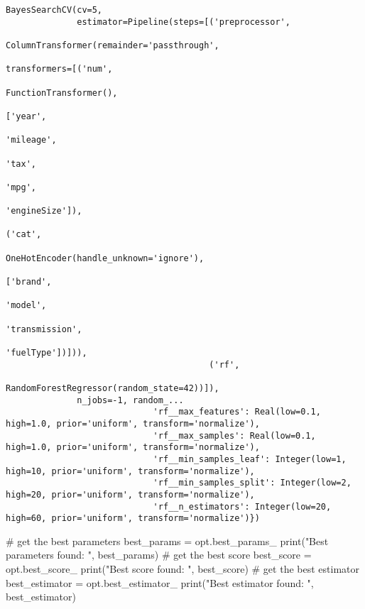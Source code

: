 \documentclass[
  letterpaper,
  DIV=11,
  numbers=noendperiod]{scrreprt}
\newenvironment{Shaded}{\begin{snugshade}}{\end{snugshade}}
\newcommand{\BuiltInTok}[1]{\textcolor[rgb]{0.00,0.23,0.31}{#1}}
\newcommand{\CommentTok}[1]{\textcolor[rgb]{0.37,0.37,0.37}{#1}}
\newcommand{\NormalTok}[1]{\textcolor[rgb]{0.00,0.23,0.31}{#1}}
\newcommand{\OperatorTok}[1]{\textcolor[rgb]{0.37,0.37,0.37}{#1}}
\newcommand{\StringTok}[1]{\textcolor[rgb]{0.13,0.47,0.30}{#1}}
\begin{document}
\begin{verbatim}
BayesSearchCV(cv=5,
              estimator=Pipeline(steps=[('preprocessor',
                                         ColumnTransformer(remainder='passthrough',
                                                           transformers=[('num',
                                                                          FunctionTransformer(),
                                                                          ['year',
                                                                           'mileage',
                                                                           'tax',
                                                                           'mpg',
                                                                           'engineSize']),
                                                                         ('cat',
                                                                          OneHotEncoder(handle_unknown='ignore'),
                                                                          ['brand',
                                                                           'model',
                                                                           'transmission',
                                                                           'fuelType'])])),
                                        ('rf',
                                         RandomForestRegressor(random_state=42))]),
              n_jobs=-1, random_...
                             'rf__max_features': Real(low=0.1, high=1.0, prior='uniform', transform='normalize'),
                             'rf__max_samples': Real(low=0.1, high=1.0, prior='uniform', transform='normalize'),
                             'rf__min_samples_leaf': Integer(low=1, high=10, prior='uniform', transform='normalize'),
                             'rf__min_samples_split': Integer(low=2, high=20, prior='uniform', transform='normalize'),
                             'rf__n_estimators': Integer(low=20, high=60, prior='uniform', transform='normalize')})
\end{verbatim}

\begin{Shaded}
\begin{Highlighting}[]
\CommentTok{\# get the best parameters}
\NormalTok{best\_params }\OperatorTok{=}\NormalTok{ opt.best\_params\_}
\BuiltInTok{print}\NormalTok{(}\StringTok{"Best parameters found: "}\NormalTok{, best\_params)}
\CommentTok{\# get the best score}
\NormalTok{best\_score }\OperatorTok{=}\NormalTok{ opt.best\_score\_}
\BuiltInTok{print}\NormalTok{(}\StringTok{"Best score found: "}\NormalTok{, best\_score)}
\CommentTok{\# get the best estimator}
\NormalTok{best\_estimator }\OperatorTok{=}\NormalTok{ opt.best\_estimator\_}
\BuiltInTok{print}\NormalTok{(}\StringTok{"Best estimator found: "}\NormalTok{, best\_estimator)}
\end{Highlighting}
\end{Shaded}
\end{document}
